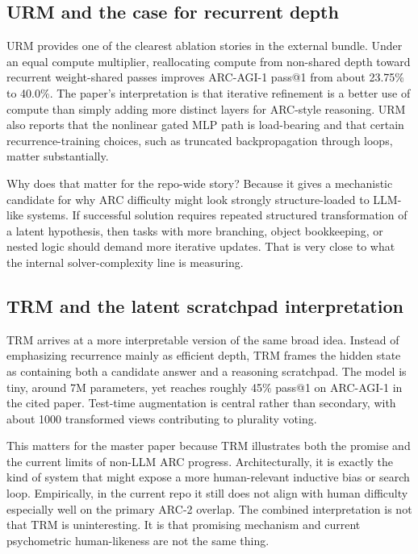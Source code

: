 \subsection{URM and the case for recurrent depth}

URM provides one of the clearest ablation stories in the external bundle. Under an equal compute multiplier, reallocating compute from non-shared depth toward recurrent weight-shared passes improves ARC-AGI-1 pass@1 from about 23.75\% to 40.0\%. The paper's interpretation is that iterative refinement is a better use of compute than simply adding more distinct layers for ARC-style reasoning. URM also reports that the nonlinear gated MLP path is load-bearing and that certain recurrence-training choices, such as truncated backpropagation through loops, matter substantially.

Why does that matter for the repo-wide story? Because it gives a mechanistic candidate for why ARC difficulty might look strongly structure-loaded to LLM-like systems. If successful solution requires repeated structured transformation of a latent hypothesis, then tasks with more branching, object bookkeeping, or nested logic should demand more iterative updates. That is very close to what the internal solver-complexity line is measuring.

\subsection{TRM and the latent scratchpad interpretation}

TRM arrives at a more interpretable version of the same broad idea. Instead of emphasizing recurrence mainly as efficient depth, TRM frames the hidden state as containing both a candidate answer and a reasoning scratchpad. The model is tiny, around 7M parameters, yet reaches roughly 45\% pass@1 on ARC-AGI-1 in the cited paper. Test-time augmentation is central rather than secondary, with about 1000 transformed views contributing to plurality voting.

This matters for the master paper because TRM illustrates both the promise and the current limits of non-LLM ARC progress. Architecturally, it is exactly the kind of system that might expose a more human-relevant inductive bias or search loop. Empirically, in the current repo it still does not align with human difficulty especially well on the primary ARC-2 overlap. The combined interpretation is not that TRM is uninteresting. It is that promising mechanism and current psychometric human-likeness are not the same thing.

